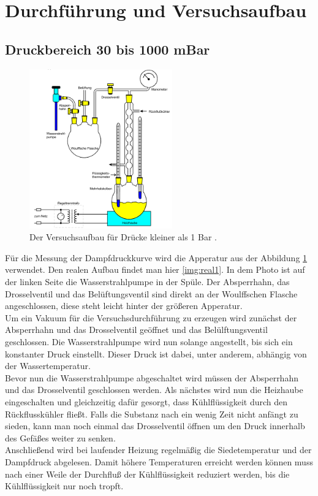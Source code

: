\section{Durchführung und Versuchsaufbau}

\subsection{Druckbereich 30 bis 1000 mBar}
\begin{figure}[H]
    \centering
    \includegraphics[width=0.55\textwidth]{images/Abbildung3.PNG}
    \caption{Der Versuchsaufbau für Drücke kleiner als 1 Bar \protect \cite{V203}.}
    \label{img:aufbau1}
\end{figure}
Für die Messung der Dampfdruckkurve wird die Apperatur aus der Abbildung \ref{img:aufbau1} verwendet. 
Den realen Aufbau findet man hier \ref{img:real1}. In dem Photo ist auf der linken Seite die Wasserstrahlpumpe in der Spüle. 
Der Absperrhahn, das Drosselventil und das Belüftungsventil sind direkt an der Woulffschen Flasche angeschlossen, diese steht leicht 
hinter der größeren Apperatur. \\
Um ein Vakuum für die Versuchsdurchführung zu erzeugen wird zunächst der Absperrhahn und das Drosselventil geöffnet und das 
Belülftungsventil geschlossen. 
Die Wasserstrahlpumpe wird nun solange angestellt, bis sich ein konstanter Druck einstellt. 
Dieser Druck ist dabei, unter anderem, abhängig von der Wassertemperatur.\\
Bevor nun die Wasserstrahlpumpe abgeschaltet wird müssen der Absperrhahn und das Drosselventil geschlossen werden. Als nächstes wird nun die Heizhaube 
eingeschalten und gleichzeitig dafür gesorgt, dass Kühlflüssigkeit durch den Rückflusskühler fließt. Falls die Substanz nach ein wenig Zeit 
nicht anfängt zu sieden, kann man noch einmal das Drosselventil öffnen um den Druck innerhalb des Gefäßes weiter zu senken.\\
Anschließend wird bei laufender Heizung regelmäßig die Siedetemperatur und der Dampfdruck abgelesen. Damit höhere Temperaturen erreicht werden können
muss nach einer Weile der Durchfluß der Kühlflüssigkeit reduziert werden, bis die Kühlflüssigkeit nur noch tropft.


